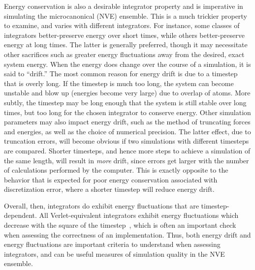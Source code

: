 \documentclass[9pt,bestpractices]{livecoms}
\begin{document}
Energy conservation is also a desirable integrator property and is imperative in simulating the microcanonical (NVE) ensemble.
This is a much trickier property to examine, and varies with different integrators.
For instance, some classes of integrators better-preserve energy over short times, while others better-preserve energy at long times.
The latter is generally preferred, though it may necessitate other sacrifices such as greater energy fluctuations away from the desired, exact system energy.
When the energy does change over the course of a simulation, it is said to ``drift.''
The most common reason for energy drift is due to a timestep that is overly long.
If the timestep is much too long, the system can become unstable and blow up (energies become very large) due to overlap of atoms.
More subtly, the timestep may be long enough that the system is still stable over long times, but too long for the chosen integrator to conserve energy.
Other simulation parameters may also impact energy drift, such as the method of truncating forces and energies, as well as the choice of numerical precision.
The latter effect, due to truncation errors, will become obvious if two simulations with different timesteps are compared.
Shorter timesteps, and hence more steps to achieve a simulation of the same length, will result in \textit{more} drift, since errors get larger with the number of calculations performed by the computer.
This is exactly opposite to the behavior that is expected for poor energy conservation associated with discretization error, where a shorter timestep will reduce energy drift.

Overall, then, integrators do exhibit energy fluctuations that are timestep-dependent.
All Verlet-equivalent integrators exhibit energy fluctuations which decrease with the square of the timestep~\cite{allen_computer_2017}, which is often an important check when assessing the correctness of an implementation.
Thus, both energy drift and energy fluctuations are important criteria to understand when assessing integrators, and can be useful measures of simulation quality in the NVE ensemble.
\end{document}
